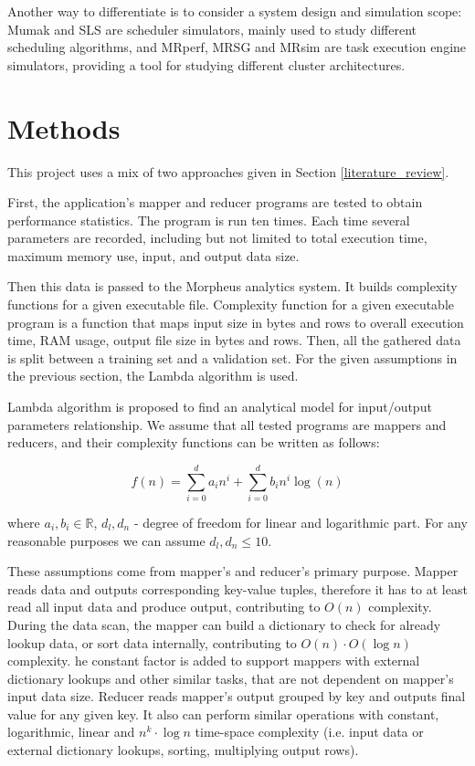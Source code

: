 \documentclass[conference]{IEEEtran} \IEEEoverridecommandlockouts
\begin{document}
    Another way to differentiate is to consider a system design and simulation
    scope: Mumak and SLS\cite{sls} are scheduler simulators, mainly used to study
    different scheduling algorithms, and MRperf, MRSG and MRsim are task
    execution engine simulators, providing a tool for studying different
    cluster architectures.


    \section{Methods} 

    This project uses a mix of two approaches given in Section \ref{literature_review}.

    First, the application's mapper and reducer programs are tested to obtain
    performance statistics. The program is run ten times. Each time several
    parameters are recorded, including but not limited to total execution time,
    maximum memory use, input, and output data size.

    Then this data is passed to the Morpheus analytics system. It builds
    complexity functions for a given executable file. Complexity function for a
    given executable program is a function that maps input size in bytes and
    rows to overall execution time, RAM usage, output file size in bytes and
    rows. Then, all the gathered data is split between a training set and a
    validation set. For the given assumptions in the previous section, the
    Lambda algorithm is used.

    Lambda algorithm is proposed to find an analytical model for input/output
    parameters relationship. We assume that all tested programs are mappers and
    reducers, and their complexity functions can be written as follows:
    
    \begin{equation} 
        f(n) = \sum_{i = 0}^d a_in^i + \sum_{i=0}^d b_in^i\log(n)
    \end{equation} 
    
    where $a_i, b_i \in \mathbb{R}$, $d_l, d_n$ - degree of freedom for linear 
    and logarithmic part. For any reasonable purposes we can assume 
    $d_l, d_n \leqslant 10$. 

    These assumptions come from mapper's and reducer's primary purpose. Mapper
    reads data and outputs corresponding key-value tuples, therefore it has to
    at least read all input data and produce output, contributing to $O(n)$
    complexity.  During the data scan, the mapper can build a dictionary to
    check for already lookup data, or sort data internally, contributing to
    $O(n)\cdot O(\log n)$ complexity.  he constant factor is added to support
    mappers with external dictionary lookups and other similar tasks, that are
    not dependent on mapper's input data size. Reducer reads mapper's output
    grouped by key and outputs final value for any given key.  It also can
    perform similar operations with constant, logarithmic, linear and $n^k
    \cdot \log n$ time-space complexity (i.e. input data or external dictionary
    lookups, sorting, multiplying output rows).
\end{document}

